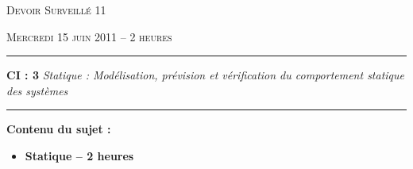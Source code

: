 \documentclass[10pt,oneside]{article}
\begin{document}
\pagestyle{fancy}
\renewcommand{\headrulewidth}{0.2pt}

\fancyhead{}


\renewcommand{\footrulewidth}{0.2pt}
\fancyfoot[C]{\bfseries \thepage}




\vspace{1cm}

\begin{center}
 \huge\textsc{Devoir Surveillé 11}

\vspace{1cm}

 \large\textsc{Mercredi 15 juin 2011 -- 2 heures}
\end{center}

\vspace{1cm}


\noindent\rule{\linewidth}{.2pt}
\begin{center}
 \large\textbf{CI : 3} \textit{Statique : Modélisation, prévision et vérification du comportement statique des systèmes}

\end{center}
\noindent\rule{\linewidth}{.2pt}


\vfill

\textbf{Contenu du sujet :}
\begin{itemize}
\item \textbf{Statique -- 2 heures}
\end{itemize}

\vfill
\end{document}
